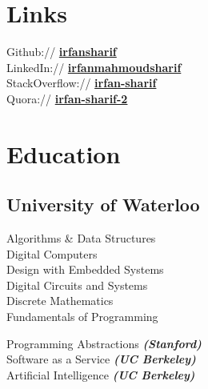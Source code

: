 \begin{minipage}[t]{0.33\textwidth}
        \section{Links} 

        Github:// \href{https://github.com/irfansharif}{\bf irfansharif} \\
        LinkedIn:// \href{https://ca.linkedin.com/in/irfanmahmoudsharif
        }{\bf irfanmahmoudsharif
        } \\
        StackOverflow:// \href{http://stackoverflow.com/users/4930863/irfan-sharif}{\bf irfan-sharif}\\
        Quora:// \href{http://www.quora.com/Irfan-Sharif-2}{\bf irfan-sharif-2}


        \section{Education} 

        \subsection{University of Waterloo}


        \sectionspace %

        Algorithms \& Data Structures\\
        Digital Computers \\
        Design with Embedded Systems \\
        Digital Circuits and Systems \\
        Discrete Mathematics \\
        Fundamentals of Programming\\
        \sectionspace %

        Programming Abstractions {\footnotesize \textit{\textbf{(Stanford)}}}\\
        Software as a Service {\footnotesize \textit{\textbf{(UC Berkeley)}}}\\
        Artificial Intelligence {\footnotesize \textit{\textbf{(UC Berkeley)}}}


\end{minipage}
